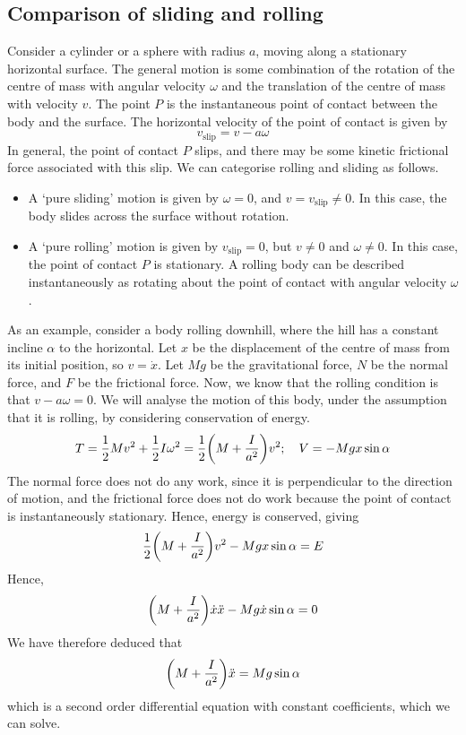 \subsection{Comparison of sliding and rolling}
Consider a cylinder or a sphere with radius \(a\), moving along a stationary horizontal surface.
The general motion is some combination of the rotation of the centre of mass with angular velocity \(\omega\) and the translation of the centre of mass with velocity \(v\).
The point \(P\) is the instantaneous point of contact between the body and the surface.
The horizontal velocity of the point of contact is given by
\[
	v_\text{slip} = v - a\omega
\]
In general, the point of contact \(P\) slips, and there may be some kinetic frictional force associated with this slip.
We can categorise rolling and sliding as follows.
\begin{itemize}
	\item A `pure sliding' motion is given by \(\omega = 0\), and \(v = v_\text{slip} \neq 0\).
	      In this case, the body slides across the surface without rotation.
	\item A `pure rolling' motion is given by \(v_\text{slip} = 0\), but \(v \neq 0\) and \(\omega \neq 0\).
	      In this case, the point of contact \(P\) is stationary.
	      A rolling body can be described instantaneously as rotating about the point of contact with angular velocity \(\omega\).
\end{itemize}
As an example, consider a body rolling downhill, where the hill has a constant incline \(\alpha\) to the horizontal.
Let \(x\) be the displacement of the centre of mass from its initial position, so \(v = \dot x\).
Let \(Mg\) be the gravitational force, \(N\) be the normal force, and \(F\) be the frictional force.
Now, we know that the rolling condition is that \(v - a\omega = 0\).
We will analyse the motion of this body, under the assumption that it is rolling, by considering conservation of energy.
\[
	T = \frac{1}{2}Mv^2 + \frac{1}{2}I\omega^2 = \frac{1}{2}\qty(M + \frac{I}{a^2})v^2;\quad V = -Mgx\sin\alpha
\]
The normal force does not do any work, since it is perpendicular to the direction of motion, and the frictional force does not do work because the point of contact is instantaneously stationary.
Hence, energy is conserved, giving
\[
	\frac{1}{2}\qty(M + \frac{I}{a^2})v^2 - Mgx\sin\alpha = E
\]
Hence,
\[
	\qty(M + \frac{I}{a^2})\dot x \ddot x - Mg \dot x \sin\alpha = 0
\]
We have therefore deduced that
\[
	\qty(M + \frac{I}{a^2})\ddot x = Mg\sin\alpha
\]
which is a second order differential equation with constant coefficients, which we can solve.
